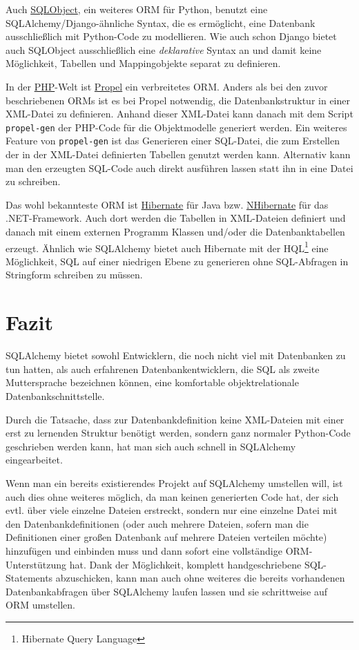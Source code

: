 Auch \href{http://www.sqlobject.org}{SQLObject}, ein weiteres ORM für Python,
benutzt eine SQLAlchemy/Django-ähnliche Syntax, die es ermöglicht, eine
Datenbank ausschließlich mit Python-Code zu modellieren. Wie auch schon Django
bietet auch SQLObject ausschließlich eine \emph{deklarative} Syntax an und damit
keine Möglichkeit, Tabellen und Mappingobjekte separat zu definieren.

In der \href{http://www.php.net}{PHP}-Welt ist
\href{http://www.propelorm.org}{Propel} ein verbreitetes ORM. Anders als bei den
zuvor beschriebenen ORMs ist es bei Propel notwendig, die Datenbankstruktur in
einer XML-Datei zu definieren. Anhand dieser XML-Datei kann danach mit dem
Script \texttt{propel-gen} der PHP-Code für die Objektmodelle generiert werden.
Ein weiteres Feature von \texttt{propel-gen} ist das Generieren einer SQL-Datei,
die zum Erstellen der in der XML-Datei definierten Tabellen genutzt werden kann.
Alternativ kann man den erzeugten SQL-Code auch direkt ausführen lassen statt
ihn in eine Datei zu schreiben.

Das wohl bekannteste ORM ist \href{http://www.hibernate.org/}{Hibernate} für
Java bzw. \href{http://nhforge.org/}{NHibernate} für das .NET-Framework. Auch
dort werden die Tabellen in XML-Dateien definiert und danach mit einem externen
Programm Klassen und/oder die Datenbanktabellen erzeugt. Ähnlich wie SQLAlchemy
bietet auch Hibernate mit der HQL\footnote{Hibernate Query Language} eine
Möglichkeit, SQL auf einer niedrigen Ebene zu generieren ohne SQL-Abfragen in
Stringform schreiben zu müssen.


\section{Fazit}

SQLAlchemy bietet sowohl Entwicklern, die noch nicht viel mit Datenbanken zu tun
hatten, als auch erfahrenen Datenbankentwicklern, die SQL als zweite
Muttersprache bezeichnen können, eine komfortable objektrelationale
Datenbankschnittstelle.

Durch die Tatsache, dass zur Datenbankdefinition keine XML-Dateien mit einer
erst zu lernenden Struktur benötigt werden, sondern ganz normaler Python-Code
geschrieben werden kann, hat man sich auch schnell in SQLAlchemy eingearbeitet.

Wenn man ein bereits existierendes Projekt auf SQLAlchemy umstellen will, ist
auch dies ohne weiteres möglich, da man keinen generierten Code hat, der sich evtl.
über viele einzelne Dateien erstreckt, sondern nur eine einzelne Datei mit
den Datenbankdefinitionen (oder auch mehrere Dateien, sofern man die Definitionen
einer großen Datenbank auf mehrere Dateien verteilen möchte) hinzufügen und
einbinden muss und dann sofort eine vollständige ORM-Unterstützung hat. Dank der
Möglichkeit, komplett handgeschriebene SQL-Statements abzuschicken, kann man auch
ohne weiteres die bereits vorhandenen Datenbankabfragen über SQLAlchemy laufen
lassen und sie schrittweise auf ORM umstellen.

